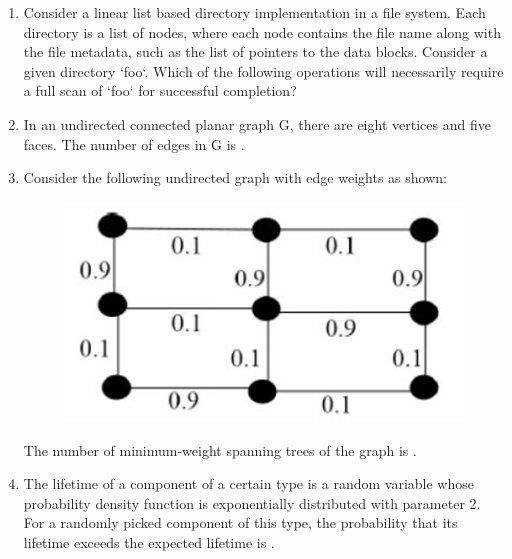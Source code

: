 \documentclass[a4paper, 11pt]{article}
\begin{document}
\begin{enumerate}
    \item Consider a linear list based directory implementation in a file system. Each directory is a list of nodes, where each node contains the file name along with the file metadata, such as the list of pointers to the data blocks. Consider a given directory `foo`. Which of the following operations will necessarily require a full scan of `foo` for successful completion?
    \begin{enumerate}
    \end{enumerate}
    \hfill{}
    
    \item In an undirected connected planar graph G, there are eight vertices and five faces. The number of edges in G is \underline{\hspace{2cm}}.
    
    \hfill{}
    
    \item Consider the following undirected graph with edge weights as shown:
    \begin{figure}[H]
        \centering
        \includegraphics[width=0.5\columnwidth]{figs/q27.png}
        \label{fig:q17}
    \end{figure}
    The number of minimum-weight spanning trees of the graph is \underline{\hspace{2cm}}.
    
    \hfill{}
    
    \item The lifetime of a component of a certain type is a random variable whose probability density function is exponentially distributed with parameter 2. For a randomly picked component of this type, the probability that its lifetime exceeds the expected lifetime  is \underline{\hspace{2cm}}.
    

\end{enumerate}
\end{document}
